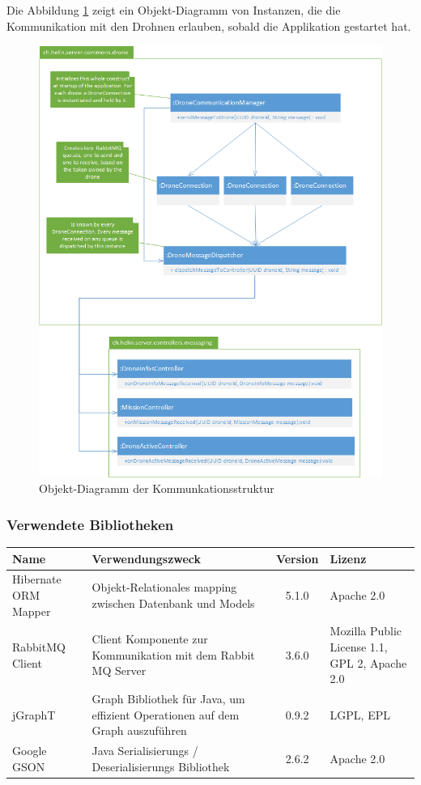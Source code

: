 Die Abbildung \ref{fig:drone-communication-diagram} zeigt ein Objekt-Diagramm von Instanzen, die die Kommunikation mit den Drohnen erlauben, sobald die Applikation gestartet hat.

\begin{figure}[H]
	\centering
	\includegraphics[width=0.8\paperwidth] {images/drone-communication-diagram.png}
	\caption{Objekt-Diagramm der Kommunkationsstruktur}
	\label{fig:drone-communication-diagram}
\end{figure}

\subsubsection{Verwendete Bibliotheken}
\begin{tabularx}{\textwidth}{|X|X|c|X|}
	\hline
	\textbf{Name} & \textbf{Verwendungszweck} & \textbf{Version} & \textbf{Lizenz} \\
	\hline \hline
	Hibernate ORM Mapper & Objekt-Relationales mapping zwischen Datenbank und Models  & 5.1.0 & Apache 2.0\\
	\hline 
	RabbitMQ Client & Client Komponente zur Kommunikation mit dem Rabbit MQ Server & 3.6.0 &  Mozilla Public License 1.1, GPL 2, Apache 2.0 \\
	\hline 
	jGraphT & Graph Bibliothek für Java, um effizient Operationen auf dem Graph auszuführen & 0.9.2 &  LGPL, EPL \\
	\hline 
	Google GSON & Java Serialisierungs / Deserialisierungs Bibliothek & 2.6.2 & Apache 2.0\\
	\hline 
\end{tabularx}

